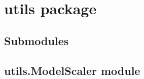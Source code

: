 \documentclass[letterpaper,10pt,english,openany,oneside]{sphinxmanual}
\begin{document}
\section{utils package}
\label{\detokenize{_modules/utils:utils-package}}\label{\detokenize{_modules/utils::doc}}

\subsection{Submodules}
\label{\detokenize{_modules/utils:submodules}}

\subsection{utils.ModelScaler module}
\label{\detokenize{_modules/utils:module-utils.ModelScaler}}\label{\detokenize{_modules/utils:utils-modelscaler-module}}
\end{document}
